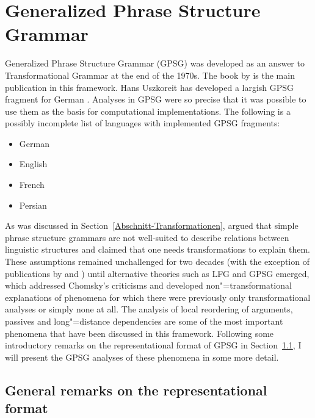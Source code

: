 
\chapter{Generalized Phrase Structure Grammar}
\label{Kapitel-GPSG}\label{chap-gpsg}

Generalized Phrase Structure Grammar (GPSG) was developed as an answer %
to Transformational Grammar at the end of the 1970s. The book by \citet*{GKPS85a} is the main publication in
this framework. Hans Uszkoreit has developed a largish GPSG fragment for German \citeyearpar{Uszkoreit87a}.
Analyses in GPSG were so precise that it was possible to use them as the basis for computational implementations.
The following is a possibly incomplete list of languages with implemented GPSG fragments:
\begin{itemize}
\item German \citep{Weisweber87a-u,WP92b,Naumann87a-u,Naumann88-u-gekauft,Volk88}
\item English \citep*{Evans85a-u,PT85a-u,Phillips92a-u,GCB93a-u}
\item French \citep*{EdSB96a}
\item Persian \citep*{BSM2011a}
\end{itemize}

\noindent
As was discussed in Section~\ref{Abschnitt-Transformationen}, \citet{Chomsky57a} argued that simple phrase structure
grammars are not well-suited to describe relations between linguistic structures and claimed that one needs transformations to
explain them. These assumptions remained unchallenged for two decades (with the exception of publications by 
and ) until alternative theories such as LFG and GPSG emerged, which addressed Chomsky's criticisms and developed non"=transformational explanations of phenomena for which there were previously only transformational analyses
or simply none at all. The analysis of local reordering of arguments, passives and long"=distance dependencies are some of the most important phenomena
that have been discussed in this framework. Following some introductory remarks on the representational format of GPSG in Section~\ref{sec-Representationsformat}, I will
present the GPSG analyses of these phenomena in some more detail.

\section{General remarks on the representational format}
\label{sec-Representationsformat}

